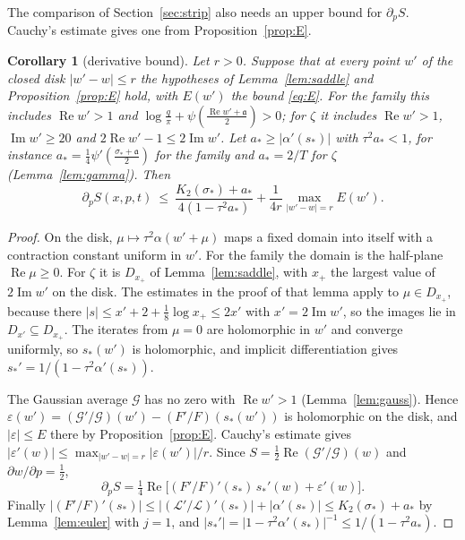 \documentclass[11pt]{article}
\newtheorem{corollary}[theorem]{Corollary}
\theoremstyle{definition}
\theoremstyle{remark}
\newcommand{\cG}{\mathcal G}
\newcommand{\cL}{\mathcal L}
\newcommand{\fa}{\mathfrak a}
\newcommand{\re}{\operatorname{Re}}
\newcommand{\im}{\operatorname{Im}}
\numberwithin{equation}{section}
\begin{document}
The comparison of Section~\ref{sec:strip} also needs an upper bound for
$\partial_pS$. Cauchy's estimate gives one from
Proposition~\ref{prop:E}.

\begin{corollary}[derivative bound]\label{cor:derivative}
Let $r>0$. Suppose that at every point $w'$ of the closed disk
$\lvert w'-w\rvert\le r$ the hypotheses of Lemma~\ref{lem:saddle} and
Proposition~\ref{prop:E} hold, with $E(w')$ the bound \eqref{eq:E}. For the
family this includes $\re w'>1$ and
$\log\frac q\pi+\psi(\frac{\re w'+\fa}2)>0$; for $\zeta$ it includes
$\re w'>1$, $\im w'\ge20$ and $2\re w'-1\le2\im w'$. Let
$a_*\ge\lvert\alpha'(s_*)\rvert$ with $\tau^2a_*<1$, for instance
$a_*=\frac14\psi'(\frac{\sigma_*+\fa}2)$ for the family and $a_*=2/T$ for
$\zeta$ (Lemma~\ref{lem:gamma}). Then
\[
\partial_pS(x,p,t)\ \le\ \frac{K_2(\sigma_*)+a_*}{4(1-\tau^2a_*)}+\frac1{4r}\max_{\lvert w'-w\rvert=r}E(w').
\]
\end{corollary}

\begin{proof}
On the disk, $\mu\mapsto\tau^2\alpha(w'+\mu)$ maps a fixed domain into
itself with a contraction constant uniform in $w'$. For the family the
domain is the half-plane $\re\mu\ge0$. For $\zeta$ it is $D_{x_+}$ of
Lemma~\ref{lem:saddle}, with $x_+$ the largest value of $2\im w'$ on the
disk. The estimates in the proof of that lemma apply to $\mu\in D_{x_+}$,
because there $\lvert s\rvert\le x'+2+\frac18\log x_+\le2x'$ with
$x'=2\im w'$, so the images lie in $D_{x'}\subseteq D_{x_+}$. The iterates
from $\mu=0$
are holomorphic in $w'$ and converge uniformly, so $s_*(w')$ is
holomorphic, and implicit differentiation gives
$s_*'=1/(1-\tau^2\alpha'(s_*))$.

The Gaussian average $\cG$ has no zero with $\re w'>1$
(Lemma~\ref{lem:gauss}). Hence
$\varepsilon(w')=(\cG'/\cG)(w')-(F'/F)(s_*(w'))$ is holomorphic on the
disk, and $\lvert\varepsilon\rvert\le E$ there by
Proposition~\ref{prop:E}. Cauchy's estimate gives
$\lvert\varepsilon'(w)\rvert\le\max_{\lvert w'-w\rvert=r}\lvert\varepsilon(w')\rvert/r$.
Since $S=\frac12\re(\cG'/\cG)(w)$ and $\partial w/\partial p=\frac12$,
\[
\partial_pS=\tfrac14\re\bigl[(F'/F)'(s_*)\,s_*'(w)+\varepsilon'(w)\bigr].
\]
Finally
$\lvert(F'/F)'(s_*)\rvert\le\lvert(\cL'/\cL)'(s_*)\rvert+\lvert\alpha'(s_*)\rvert\le K_2(\sigma_*)+a_*$
by Lemma~\ref{lem:euler} with $j=1$, and
$\lvert s_*'\rvert=\lvert1-\tau^2\alpha'(s_*)\rvert^{-1}\le1/(1-\tau^2a_*)$.
\end{proof}
\end{document}
